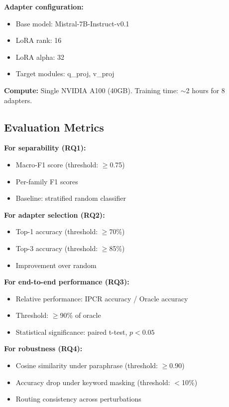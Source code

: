 \textbf{Adapter configuration:}
\begin{itemize}
    \item Base model: Mistral-7B-Instruct-v0.1
    \item LoRA rank: 16
    \item LoRA alpha: 32
    \item Target modules: q\_proj, v\_proj
\end{itemize}

\textbf{Compute:} Single NVIDIA A100 (40GB). Training time: $\sim$2 hours for 8 adapters.

\subsection{Evaluation Metrics}

\textbf{For separability (RQ1):}
\begin{itemize}
    \item Macro-F1 score (threshold: $\geq$0.75)
    \item Per-family F1 scores
    \item Baseline: stratified random classifier
\end{itemize}

\textbf{For adapter selection (RQ2):}
\begin{itemize}
    \item Top-1 accuracy (threshold: $\geq$70\%)
    \item Top-3 accuracy (threshold: $\geq$85\%)
    \item Improvement over random
\end{itemize}

\textbf{For end-to-end performance (RQ3):}
\begin{itemize}
    \item Relative performance: IPCR accuracy / Oracle accuracy
    \item Threshold: $\geq$90\% of oracle
    \item Statistical significance: paired t-test, $p < 0.05$
\end{itemize}

\textbf{For robustness (RQ4):}
\begin{itemize}
    \item Cosine similarity under paraphrase (threshold: $\geq$0.90)
    \item Accuracy drop under keyword masking (threshold: $<$10\%)
    \item Routing consistency across perturbations
\end{itemize}
